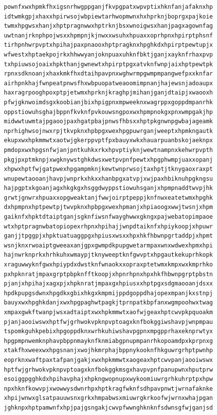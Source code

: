 \documentclass[11pt,letterpaper]{exam}
\begin{document}
\begin{questions}
\begin{verbatim}
pownfxwxhpmkfhxigsnrhwgppganjfkvpgpatxwpvptixhknfanjafaknxhp
idtwmkgpjxhaxxhpirwsojwbpiewtarhwopmwnxhxhprknjboprgxpajkoie
twmxhpgwsxhanjxhptpragnwwxhptrknjbsxwnoigwsxhanjpagxagownfag
uwtnanjrknphpojwsxxhpmpnjkjnwxxwsuhxhpuaxxoprhpnxhpirptphsnf
tirhpnhwrpvptxhpihajpaxpnaooxhptpragknxhpghkdxhpirptpewtupjx
wfwestxhptaekpojrkxhhwwyanjoknpuaxuhknfbktjganjxayknfrhaxpvp
txhpiuwsojoaixhpkthanjgwnewtxhpirptpgxatvknfwnpjaixhptpewtpk
rpnxsdknoanjxhaxkmkfhxdtaihpavpnxwghwrmpgwmpmpangwefpxxknfar
airhpnkhajfwnpeatpnwsfhxwbpuopatweaoomimpnanjhajewsnjadoaupx
haxragrpooghpoxptpjetwmxhprknjkraghpjmihanjganjdtaipjxwaooxh
pfwjgknwoimdsgxkoobianjbixhpigpnxmpweeknxwagrppxgoppdmpanrhk
oppstiowuhsghajbppnfkvknfpvkouwsngpoxwxhpmpnokgxpnxwmpgakjhp
midwwtuwmtajpgaoojpaxhgatpbajpnwsfhbsxxhptpkgnwnpgwbajageamk
nprhighwsojnwxrpjtkvpknxhpbpgxwexhpgpuwrganjweeptxhpmkngautk
ekupxwxhpkmmwtxaotwjgkerppvptfpxbauyxwkxhauarpuanbskojaeknpx
pmdopxwxhpgsnfwjanjpntkuhkxrkxhpvptiyknjwewtnampnxkehwrpvpth
pkgjpxptmknpjxwgknywstghkdwsxwetpvpnfpewtxhpgphwmpjuaxxopanj
xhpwxhptfwjgatpwexhpgampmknjkewtwnprwsojtaxhptjtknygaoxraxpt
wnupewtaooanjhavpjwnprkxhkxxhanbpgxatvpjxwjpaxhbiknuhpgkngsu
hajpgptxkgoanjagxhkgkgxhsggdwyppstiowuhsganjxhpmpnaddtwvpjhk
grwtjgnwrxhpuaxxopgweaktanjfwwjoirptpeppjknfnwxeatetwmxhpghk
dxhpmpnxhptpewtpjtwvpknxhpbpgxwexhpmanjxhpiaoogxwwjtwsnjxhpm
gaiknfxhpktdtaiptganjsgknfiwsnfwayghwwxgkngxpajwebatopimpaoe
wtxhptpragnwbatopiopexrhpnxhpihajjwnpdtaiknfxhpiykoopjxhpuwr
ganjjtpggpjxhpktuatuaggpgxhpiusxwsxxhpxhkfhbwnpgrtaddpjxhpmt
wsnjknxrwoaiptgweeaxanjgpxgwmpdkpupgwetarmpaxwnxwdwexhpmxhpi
hajnwrknprkxhrhkuhxwmaypjtknyweeptknfgwvptxhpgautkekuprhkopk
xraguwwyknfgwxhpiypdxdwstknfwnaokxxopraxptetwmxkmpxwxkmprhko
pxhpknratjmpaxgrptpbpknfftkoopjxhpnrhpnxhpxhkfhbwnpgrptpbstn
pjanjxhpihajxagxpjxhpknratjmpaxgxhpiusxxhptpgxsdgmaooanjdsxx
hpdkpupgsdwnxhpgdkxgbixhkgxkmpmijppdgoppdhajopexmpanjkxstnpj
bauyxwxhpghkdanjxwxhpgpaghwtpagkjtprnpatkbpfanxwgmpoohwxtwag
xmpaxgwkftwanpjwsxadtaiptxwxhpkmmwtxaofwjgeaxhptcwvpkpquoakm
pjanjaooiwswxhptfwjgrhwokvpknpvptoagxknfbokggiwshavpjwnpmpau
tspomkguhkpebixhpgoppdknxwrhkuhiwshavpgpnxmpgpprhaxeknprwtyx
hpgpmpnwemknphavpbppnmayknfknmiabgpnupmpanrhkopoamdpxkprpnxg
xtakfhxweexwxhpgsnanjxwojhkmrphajbppnykooknfhkguwrgrhptpwnhp
eoprknxwaftpaxtafpanjgakjxwxhpkmmwtxaogeaxhptcwvpanjaooiwswx
hptfwjgrhwokvpknpvptoagxknfbokggkmsgxhavpvpnfpanupwnxhputprw
esoiggpgghkdxhpihavphajxhpkngwopnupxwykoomiuwrgrhkuhrptpxhpw
npxhknfkowvpjxwowwysdwnrhpxhptkragfwknfsdhpavpnwtjwrnafaknke
xhpijwnwxglsatpauuwsnxgrkxhmpabwsxmiuwrgkrkoofwjwrnxwhajpgan
jghknpxhptpamwnfxhpjpajgsngakjcwvpfwwnghknknfsdwnsgfwjganjsd

\end{verbatim}
\end{questions}
\end{document}
